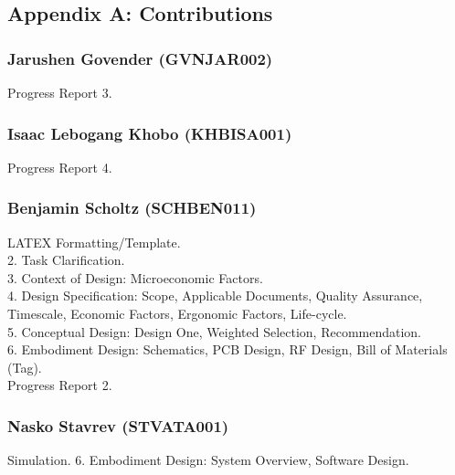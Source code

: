 
\newpage





\newpage
\vspace*{\fill}
\begin{center}
\subsection*{Appendix A: Contributions}
\end{center}
\vspace*{\fill}

\newpage
\subsubsection*{Jarushen Govender (GVNJAR002)}
Progress Report 3.
\subsubsection*{Isaac Lebogang Khobo (KHBISA001)}
Progress Report 4.
\subsubsection*{Benjamin Scholtz (SCHBEN011)}
LATEX Formatting/Template. \\
2. Task Clarification. \\
3. Context of Design: Microeconomic Factors. \\
4. Design Specification: Scope, Applicable Documents, Quality Assurance, Timescale, Economic Factors, Ergonomic Factors, Life-cycle. \\
5. Conceptual Design: Design One, Weighted Selection, Recommendation. \\
6. Embodiment Design: Schematics, PCB Design, RF Design, Bill of Materials (Tag). \\
Progress Report 2.
\subsubsection*{Nasko Stavrev (STVATA001)}
Simulation.
6. Embodiment Design: System Overview, Software Design.

